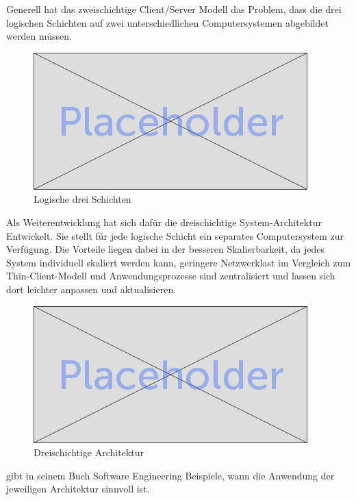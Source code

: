 	Generell hat das zweischichtige Client/Server Modell das Problem, dass die drei logischen Schichten auf zwei unterschiedlichen Computersystemen abgebildet werden müssen. \\
	
	\begin{figure}[h]
		\centering
		\includegraphics[width=0.5\linewidth]{images/placeholder}
		\caption{Logische drei Schichten}
		\label{fig:log3schichten}
	\end{figure}
	
	Als Weiterentwicklung hat sich dafür die dreischichtige System-Architektur Entwickelt. Sie stellt für jede logische Schicht ein separates Computersystem zur Verfügung. Die Vorteile liegen dabei in der besseren Skalierbarkeit, da jedes System individuell skaliert werden kann, geringere Netzwerklast im Vergleich zum Thin-Client-Modell und Anwendungsprozesse sind zentralisiert und lassen sich dort leichter anpassen und aktualisieren.
	

	\begin{figure}[h]
		\centering
		\includegraphics[width=0.5\linewidth]{images/placeholder}
		\caption{Dreischichtige Architektur}
		\label{fig:3-tier-architecture}
	\end{figure}


	\citet*{Sommerville.2007} gibt in seinem Buch Software Engineering Beispiele, wann die Anwendung der jeweiligen Architektur sinnvoll ist.
	
